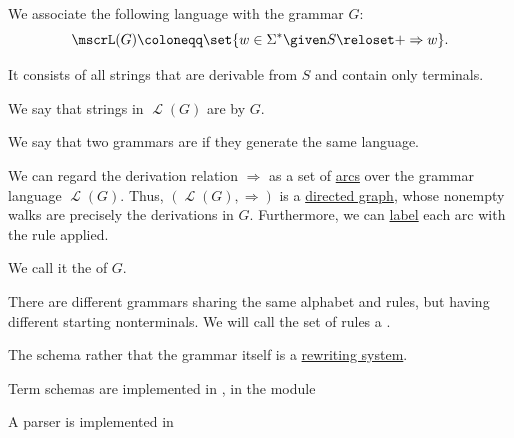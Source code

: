 \begin{definition}
\begin{thmenum}
     We associate the following language with the grammar \( G \):
    \begin{equation*}
      \mscrL(G) \coloneqq \set{ w \in \Sigma^* \given S \reloset + \Rightarrow w }.
    \end{equation*}

    It consists of all strings that are derivable from \( S \) and contain only terminals.

    We say that strings in \( \mscrL(G) \) are  by \( G \).

     We say that two grammars are  if they generate the same language.

    \mimprovised We can regard the derivation relation \( \Rightarrow \) as a set of \hyperref[def:directed_graph/arcs]{arcs} over the grammar language \( \mscrL(G) \). Thus, \( (\mscrL(G), \Rightarrow) \) is a \hyperref[def:directed_graph]{directed graph}, whose nonempty walks are precisely the derivations in \( G \). Furthermore, we can \hyperref[def:labeled_set]{label} each arc with the rule applied.

    We call it the  of \( G \).

     There are different grammars sharing the same alphabet and rules, but having different starting nonterminals. We will call the set of rules a .

    The schema rather that the grammar itself is a \hyperref[def:rewriting_system]{rewriting system}.
  \end{thmenum}
\end{definition}
\begin{comments}
  \item Term schemas are implemented in \cite{notebook:code}, in the module
  \begin{CodeRefDisplay}
  \end{CodeRefDisplay}

  A parser is implemented in
  \begin{CodeRefDisplay}
  \end{CodeRefDisplay}
\end{comments}

